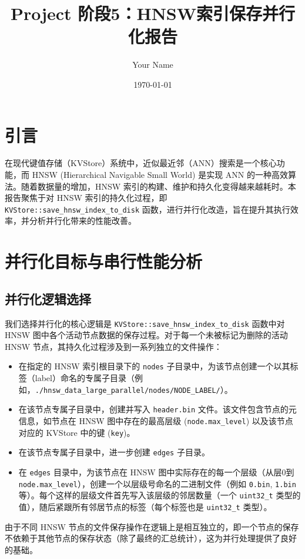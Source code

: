 \documentclass{ctexart} %
\title{Project 阶段5：HNSW索引保存并行化报告}
\author{Your Name} %
\date{\today}
\begin{document}
\maketitle
\tableofcontents
\newpage

\section{引言}
在现代键值存储（KVStore）系统中，近似最近邻（ANN）搜索是一个核心功能，而 HNSW (Hierarchical Navigable Small World) 是实现 ANN 的一种高效算法。随着数据量的增加，HNSW 索引的构建、维护和持久化变得越来越耗时。本报告聚焦于对 HNSW 索引的持久化过程，即 \texttt{KVStore::save_hnsw_index_to_disk} 函数，进行并行化改造，旨在提升其执行效率，并分析并行化带来的性能改善。

\section{并行化目标与串行性能分析}

\subsection{并行化逻辑选择}
我们选择并行化的核心逻辑是 \texttt{KVStore::save_hnsw_index_to_disk} 函数中对 HNSW 图中各个活动节点数据的保存过程。对于每一个未被标记为删除的活动 HNSW 节点，其持久化过程涉及到一系列独立的文件操作：
\begin{itemize}
    \item 在指定的 HNSW 索引根目录下的 \texttt{nodes} 子目录中，为该节点创建一个以其标签（label）命名的专属子目录（例如，\texttt{./hnsw_data_large_parallel/nodes/NODE_LABEL/}）。
    \item 在该节点专属子目录中，创建并写入 \texttt{header.bin} 文件。该文件包含节点的元信息，如节点在 HNSW 图中存在的最高层级 (\texttt{node.max_level}) 以及该节点对应的 KVStore 中的键 (\texttt{key})。
    \item 在该节点专属子目录中，进一步创建 \texttt{edges} 子目录。
    \item 在 \texttt{edges} 目录中，为该节点在 HNSW 图中实际存在的每一个层级（从层0到 \texttt{node.max_level}），创建一个以层级号命名的二进制文件（例如 \texttt{0.bin}, \texttt{1.bin} 等）。每个这样的层级文件首先写入该层级的邻居数量（一个 \texttt{uint32_t} 类型的值），随后紧跟所有邻居节点的标签（每个标签也是 \texttt{uint32_t} 类型）。
\end{itemize}
由于不同 HNSW 节点的文件保存操作在逻辑上是相互独立的，即一个节点的保存不依赖于其他节点的保存状态（除了最终的汇总统计），这为并行处理提供了良好的基础。
\end{document}
